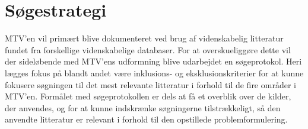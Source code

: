 \chapter{Søgestrategi}

MTV’en vil primært blive dokumenteret ved brug af videnskabelig litteratur fundet fra forskellige videnskabelige databaser. For at overskueliggøre dette vil der sideløbende med MTV’ens udformning blive udarbejdet en søgeprotokol. Heri lægges fokus på blandt andet være inklusions- og eksklusionskriterier for at kunne fokusere søgningen til det mest relevante litteratur i forhold til de fire områder i MTV’en. Formålet med søgeprotokollen er dels at få et overblik over de kilder, der anvendes, og for at kunne indskrænke søgningerne tilstrækkeligt, så den anvendte litteratur er relevant i forhold til den opstillede problemformulering. 